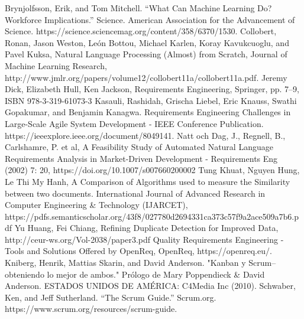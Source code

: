 \documentclass[11pt]{article}
\begin{document}
\begin{thebibliography}{99}

 Brynjolfsson, Erik, and Tom Mitchell. “What Can Machine Learning Do? Workforce Implications.” Science. American Association for the Advancement of Science. https://science.sciencemag.org/content/358/6370/1530.
 Collobert, Ronan, Jason Weston, León Bottou, Michael Karlen, Koray Kavukcuoglu, and Pavel Kuksa, Natural Language Processing (Almost) from Scratch, Journal of Machine Learning Research, http://www.jmlr.org/papers/volume12/collobert11a/collobert11a.pdf.
 Jeremy Dick, Elizabeth Hull, Ken Jackson, Requirements Engineering, Springer, pp. 7–9, ISBN 978-3-319-61073-3
 Kasauli, Rashidah, Grischa Liebel, Eric Knauss, Swathi Gopakumar, and Benjamin Kanagwa. Requirements Engineering Challenges in Large-Scale Agile System Development - IEEE Conference Publication. https://ieeexplore.ieee.org/document/8049141.
 Natt och Dag, J., Regnell, B., Carlshamre, P. et al, A Feasibility Study of Automated Natural Language Requirements Analysis in Market-Driven Development -  Requirements Eng (2002) 7: 20, https://doi.org/10.1007/s007660200002
 Tung Khuat, Nguyen Hung, Le Thi My Hanh, A Comparison of Algorithms used to measure the Similarity between two documents. International Journal of Advanced Research in Computer Engineering \& Technology (IJARCET), https://pdfs.semanticscholar.org/43f8/027780d2694331ca373c57f9a2ace509a7b6.pdf
 Yu Huang, Fei Chiang, Refining Duplicate Detection for Improved Data, http://ceur-ws.org/Vol-2038/paper3.pdf
Quality
 Requirements Engineering - Tools and Solutions Offered by OpenReq, OpenReq, https://openreq.eu/.
 Kniberg, Henrik, Mattias Skarin, and David Anderson. "Kanban y Scrum–obteniendo lo mejor de ambos." Prólogo de Mary Poppendieck \& David Anderson. ESTADOS UNIDOS DE AMÉRICA: C4Media Inc (2010).
 Schwaber, Ken, and Jeff Sutherland. “The Scrum Guide.” Scrum.org. https://www.scrum.org/resources/scrum-guide.

\end{thebibliography}
\end{document}
